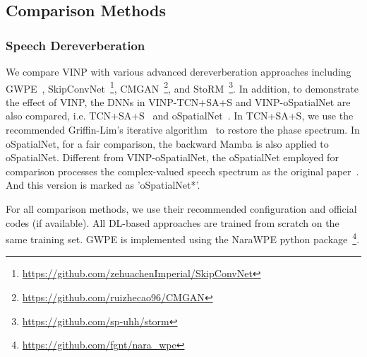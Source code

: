 \subsection{Comparison Methods}
\subsubsection{{Speech Dereverberation}}
We compare VINP with various advanced dereverberation approaches including GWPE~\cite{yoshioka2012generalization},
SkipConvNet~\cite{kothapally2020skipconvnet}\footnote{\url{https://github.com/zehuachenImperial/SkipConvNet}}, 
CMGAN~\cite{abdulatif2024cmgan}\footnote{\url{https://github.com/ruizhecao96/CMGAN}},
and StoRM~\cite{lemercier2023storm}\footnote{\url{https://github.com/sp-uhh/storm}}.
In addition, to demonstrate the effect of VINP, the DNNs in VINP-TCN+SA+S and VINP-oSpatialNet are also compared, i.e. TCN+SA+S~\cite{zhao2020monaural} and oSpatialNet~\cite{10570301}.
In TCN+SA+S, we use the recommended Griffin-Lim's iterative algorithm~\cite{griffin1984signal} to restore the phase spectrum. 
In oSpatialNet, for a fair comparison, the backward Mamba is also applied to oSpatialNet.
Different from VINP-oSpatialNet, the oSpatialNet employed for comparison processes the complex-valued speech spectrum as the original paper~\cite{10570301}.
And this version is marked as 'oSpatialNet*'. 







For all comparison methods, we use their recommended configuration and official codes (if available).
All DL-based approaches are trained from scratch on the same training set.
GWPE is implemented using the NaraWPE python package~\cite{Drude2018NaraWPE}\footnote{\url{https://github.com/fgnt/nara_wpe}}.



